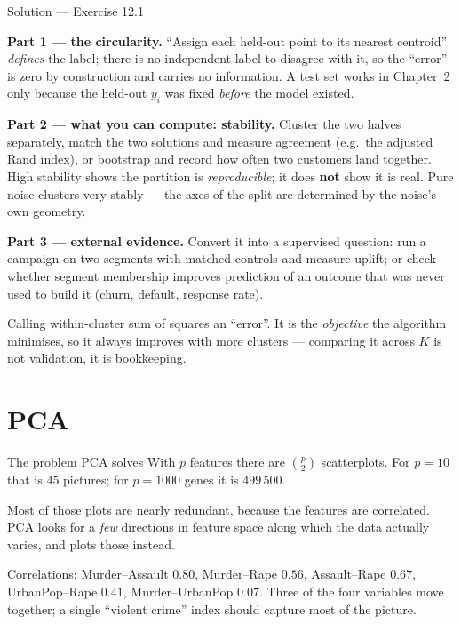 \documentclass[aspectratio=169,11pt]{beamer}
\begin{document}
\begin{frame}{Solution --- Exercise 12.1}
  \footnotesize
\begin{solutionbox}
  \textbf{Part 1 --- the circularity.} ``Assign each held-out point to its nearest
  centroid'' \emph{defines} the label; there is no independent label to disagree with it,
  so the ``error'' is zero by construction and carries no information. A test set works in
  Chapter~2 only because the held-out $y_i$ was fixed \emph{before} the model existed.

  \medskip
  \textbf{Part 2 --- what you can compute: stability.} Cluster the two halves separately,
  match the two solutions and measure agreement (e.g.\ the adjusted Rand index), or
  bootstrap and record how often two customers land together. High stability shows the
  partition is \emph{reproducible}; it does \textbf{not} show it is real. Pure noise
  clusters very stably --- the axes of the split are determined by the noise's own
  geometry.

  \medskip
  \textbf{Part 3 --- external evidence.} Convert it into a supervised question:
  run a campaign on two segments with matched controls and measure uplift; or check
  whether segment membership improves prediction of an outcome that was never used to
  build it (churn, default, response rate).
\end{solutionbox}
\begin{mistake}
  Calling within-cluster sum of squares an ``error''. It is the \emph{objective} the
  algorithm minimises, so it always improves with more clusters --- comparing it across $K$
  is not validation, it is bookkeeping.
\end{mistake}
\end{frame}

\section{PCA}

\begin{frame}{The problem PCA solves}
  With $p$ features there are $\binom{p}{2}$ scatterplots. For $p=10$ that is $45$
  pictures; for $p=1000$ genes it is $499\,500$.
  \begin{readme}
    Most of those plots are nearly redundant, because the features are correlated. PCA
    looks for a \emph{few} directions in feature space along which the data actually
    varies, and plots those instead.
  \end{readme}
  \begin{numexample}[{{USArrests, $p=4$}}]
    Correlations: Murder--Assault $0.80$, Murder--Rape $0.56$, Assault--Rape $0.67$,
    UrbanPop--Rape $0.41$, Murder--UrbanPop $0.07$. Three of the four variables move
    together; a single ``violent crime'' index should capture most of the picture.
  \end{numexample}
\end{frame}
\end{document}
